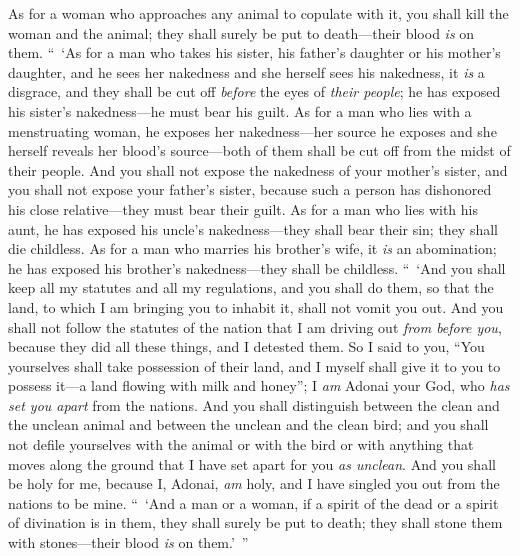 \begin{biblechapter}
\verse As for a woman who approaches any animal to copulate with it, you shall kill the woman and the animal; they shall surely be put to death—their blood \textit{is} on them.
\verse “ ‘As for a man who takes his sister, his father’s daughter or his mother’s daughter, and he sees her nakedness and she herself sees his nakedness, it \textit{is} a disgrace, and they shall be cut off \textit{before} the eyes of \textit{their people}; he has exposed his sister’s nakedness—he must bear his guilt.
\verse As for a man who lies with a menstruating woman, he exposes her nakedness—her source he exposes and she herself reveals her blood’s source—both of them shall be cut off from the midst of their people.
\verse And you shall not expose the nakedness of your mother’s sister, and you shall not expose your father’s sister, because such a person has dishonored his close relative—they must bear their guilt.
\verse As for a man who lies with his aunt, he has exposed his uncle’s nakedness—they shall bear their sin; they shall die childless.
\verse As for a man who marries his brother’s wife, it \textit{is} an abomination; he has exposed his brother’s nakedness—they shall be childless.
 “ ‘And you shall keep all my statutes and all my regulations, and you shall do them, so that the land, to which I am bringing you to inhabit it, shall not vomit you out.
\verse And you shall not follow the statutes of the nation that I am driving out \textit{from before you}, because they did all these things, and I detested them.
\verse So I said to you, “You yourselves shall take possession of their land, and I myself shall give it to you to possess it—a land flowing with milk and honey”; I \textit{am} Adonai your God, who \textit{has set you apart} from the nations.
\verse And you shall distinguish between the clean and the unclean animal and between the unclean and the clean bird; and you shall not defile yourselves with the animal or with the bird or with anything that moves along the ground that I have set apart for you \textit{as unclean}.
\verse And you shall be holy for me, because I, Adonai, \textit{am} holy, and I have singled you out from the nations to be mine.
\verse “ ‘And a man or a woman, if a spirit of the dead or a spirit of divination is in them, they shall surely be put to death; they shall stone them with stones—their blood \textit{is} on them.’ ”
\end{biblechapter}

